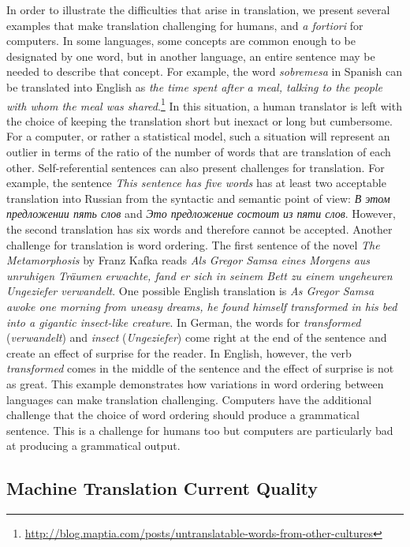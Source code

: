 In order to illustrate the difficulties that arise in
translation, we present several examples that
make translation challenging for humans, and \emph{a fortiori} for
computers. In some languages, some concepts are common enough
to be designated by one word, but in another language,
an entire sentence may be needed to describe that concept. For example, the
word \emph{sobremesa} in Spanish can be translated into English
as \emph{the time spent after a meal, talking to the people with whom the meal was shared}.\footnote{\url{http://blog.maptia.com/posts/untranslatable-words-from-other-cultures}}
In this situation, a human translator is left with the choice of
keeping the translation short but inexact or long but cumbersome.
For a computer, or rather a statistical model, such a situation will represent
an outlier in terms of the ratio of the number of words that are translation of each other.
Self-referential sentences can also present challenges for translation.
For example, the sentence \emph{This sentence has five words}
has at least two acceptable translation into Russian from the syntactic and
semantic point of view: \emph{В этом предложении пять слов} and
\emph{Это предложение состоит из пяти слов}. However, the second translation
has six words and therefore cannot be accepted.
Another challenge for translation is word ordering. The first sentence
of the novel \emph{The Metamorphosis} by Franz Kafka reads %
\emph{Als Gregor Samsa eines Morgens aus unruhigen Träumen erwachte, fand er sich in seinem Bett zu einem ungeheuren Ungeziefer verwandelt}.
One possible English translation is \emph{As Gregor Samsa awoke one morning from uneasy dreams, he found himself transformed in his bed into a gigantic insect-like creature}.
In German, the words for \emph{transformed} (\emph{verwandelt}) and \emph{insect} (\emph{Ungeziefer}) come right at the end
of the sentence and create an effect of surprise for the reader. In English, however, the verb \emph{transformed}
comes in the middle of the sentence and the effect of surprise is not
as great. This example demonstrates how variations in word ordering between languages can
make translation challenging. Computers have the additional challenge that the choice
of word ordering should produce a grammatical sentence. This is a challenge for humans too
but computers are particularly bad at producing a grammatical output.

\subsection{Machine Translation Current Quality}

